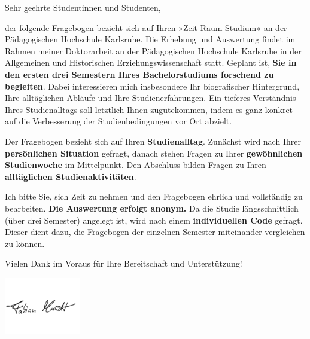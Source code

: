 

\begin{info}
\vspace{.5cm}

Sehr geehrte Studentinnen und Studenten,

\vspace{.5em}

der folgende Fragebogen bezieht sich auf Ihren »Zeit-Raum Studium« an der Pädagogischen Hochschule Karlsruhe. Die Erhebung und Auswertung findet im Rahmen meiner Doktorarbeit an der Pädagogischen Hochschule Karlsruhe in der Allgemeinen und Historischen Erziehungswissenschaft statt. Geplant ist, \textbf{Sie in den ersten drei Semestern Ihres Bachelorstudiums forschend zu begleiten}. Dabei interessieren mich insbesondere Ihr biografischer Hintergrund, Ihre alltäglichen Abläufe und Ihre Studienerfahrungen. Ein tieferes Verständnis Ihres Studienalltags soll letztlich Ihnen zugutekommen, indem es ganz konkret auf die Verbesserung der Studienbedingungen vor Ort abzielt.

\vspace{.5em}

Der Fragebogen bezieht sich auf Ihren \textbf{Studienalltag}. Zunächst wird nach Ihrer \textbf{persönlichen Situation} gefragt, danach stehen Fragen zu Ihrer \textbf{gewöhnlichen Studienwoche} im Mittelpunkt. Den Abschluss bilden Fragen zu Ihren \textbf{alltäglichen Studienaktivitäten}.

\vspace{.5em}

Ich bitte Sie, sich Zeit zu nehmen und den Fragebogen ehrlich und vollständig zu bearbeiten. \textbf{Die Auswertung erfolgt anonym.} Da die Studie längsschnittlich (über drei Semester) angelegt ist, wird nach einem \textbf{individuellen Code} gefragt. Dieser dient dazu, die Fragebogen der einzelnen Semester miteinander vergleichen zu können.

\vspace{.5em}

Vielen Dank im Voraus für Ihre Bereitschaft und Unterstützung!

\vspace{-1cm}

\includegraphics[width=0.25\textwidth]{unterschrift.png}

\vspace{-1.5cm}
\end{info}

